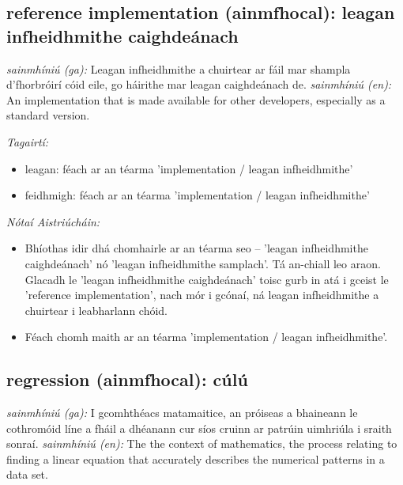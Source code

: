 \documentclass{article}
\begin{document}
\subsection*{reference implementation (ainmfhocal): leagan infheidhmithe caighdeánach} 
 \noindent \textit{sainmhíniú (ga):} Leagan infheidhmithe a chuirtear ar fáil mar shampla d'fhorbróirí cóid eile, go háirithe mar leagan caighdeánach de.
\newline\newline
 \noindent \textit{sainmhíniú (en):} An implementation that is made available for other developers, especially as a standard version.
\newline

 \noindent \textit{Tagairtí:}
\begin{itemize}
	\item leagan: féach ar an téarma 'implementation / leagan infheidhmithe'
	\item feidhmigh: féach ar an téarma 'implementation / leagan infheidhmithe'
\end{itemize}

 \noindent \textit{Nótaí Aistriúcháin:}
\begin{itemize}
	\item Bhíothas idir dhá chomhairle ar an téarma seo -- 'leagan infheidhmithe caighdeánach' nó 'leagan infheidhmithe samplach'. Tá an-chiall leo araon. Glacadh le 'leagan infheidhmithe caighdeánach' toisc gurb in atá i gceist le 'reference implementation', nach mór i gcónaí, ná leagan infheidhmithe a chuirtear i leabharlann chóid.
	\item Féach chomh maith ar an téarma 'implementation / leagan infheidhmithe'.
\end{itemize}


\subsection*{regression (ainmfhocal): cúlú} 
 \noindent \textit{sainmhíniú (ga):} I gcomhthéacs matamaitice, an próiseas a bhaineann le cothromóid líne a fháil a dhéanann cur síos cruinn ar patrúin uimhriúla i sraith sonraí.
\newline\newline
 \noindent \textit{sainmhíniú (en):} The the context of mathematics, the process relating to finding a linear equation that accurately describes the numerical patterns in a data set.
\newline
\end{document}
